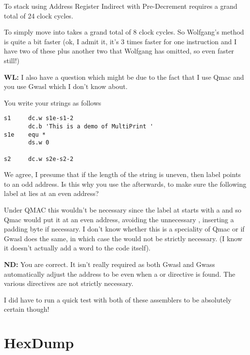 To stack  using Address Register Indirect with Pre-Decrement requires a grand total of 24 clock cycles.

To simply move  into  takes a grand total of 8 clock cycles. So Wolfgang's method is quite a bit faster (ok, I admit it, it's 3 times faster for one instruction and I have two of these plus another two that Wolfgang has omitted, so even faster still!)


\textbf{WL: }I also have a question which might be due to the fact that I use Qmac and you use Gwasl which I don't know about.

You write your strings as follows


\begin{lstlisting}[firstnumber=1,caption={MultiPrint String Table Example}]
s1     dc.w s1e-s1-2
       dc.b 'This is a demo of MultiPrint '
s1e    equ *
       ds.w 0

s2     dc.w s2e-s2-2
\end{lstlisting}

We agree, I presume that if the length of the string is uneven, then label  points to an odd address. Is this why you use the  afterwards, to make sure the following label at  lies at an even address?

Under QMAC this wouldn't be necessary since the label at  starts with a  and so Qmac would put it at an even address, avoiding the unnecessary , inserting a padding byte if necessary. I don't know whether this is a speciality of Qmac or if Gwasl does the same, in which case the  would not be strictly necessary. (I know it doesn't actually add a word to the code itself). 

\textbf{ND: }You are correct. It isn't really required as both Gwasl and Gwass automatically adjust the address to be even when a  or  directive is found. The various  directives are not strictly necessary.

I did have to run a quick test with both of these assemblers to be absolutely certain though!


\section{HexDump}

